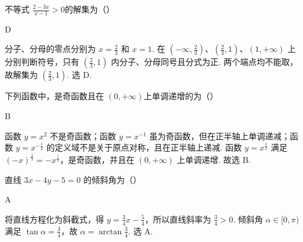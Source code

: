 \begin{problem}
不等式 \( \frac{2-3x}{x-1}>0 \)的解集为（\quad）


\begin{answer}
D
\end{answer}

\begin{solution}
分子、分母的零点分别为 \(x=\frac23\) 和 \(x=1\). 在 \((-\infty,\frac23)\)、\((\frac23,1)\)、\((1,+\infty)\) 上分别判断符号，只有 \((\frac23,1)\) 内分子、分母同号且分式为正. 两个端点均不能取，故解集为 \(\left(\frac23,1\right)\). 选 D.
\end{solution}
\end{problem}

\begin{problem}
下列函数中，是奇函数且在 \( (0,+\infty) \)上单调递增的为（\quad）


\begin{answer}
B
\end{answer}

\begin{solution}
函数 \(y=x^2\) 不是奇函数；函数 \(y=x^{-1}\) 虽为奇函数，但在正半轴上单调递减；函数 \(y=x^{-\frac12}\) 的定义域不是关于原点对称，且在正半轴上递减. 函数 \(y=x^{\frac13}\) 满足 \((-x)^{\frac13}=-x^{\frac13}\)，是奇函数，并且在 \((0,+\infty)\) 上单调递增. 故选 B.
\end{solution}
\end{problem}

\begin{problem}
直线 \(3x - 4y - 5 = 0\) 的倾斜角为（\quad）


\begin{answer}
A
\end{answer}

\begin{solution}
将直线方程化为斜截式，得 \(y=\frac34x-\frac54\)，所以直线斜率为 \(\frac34>0\). 倾斜角 \(\alpha\in[0,\pi)\) 满足 \(\tan\alpha=\frac34\)，故 \(\alpha=\arctan\frac34\). 选 A.
\end{solution}
\end{problem}

